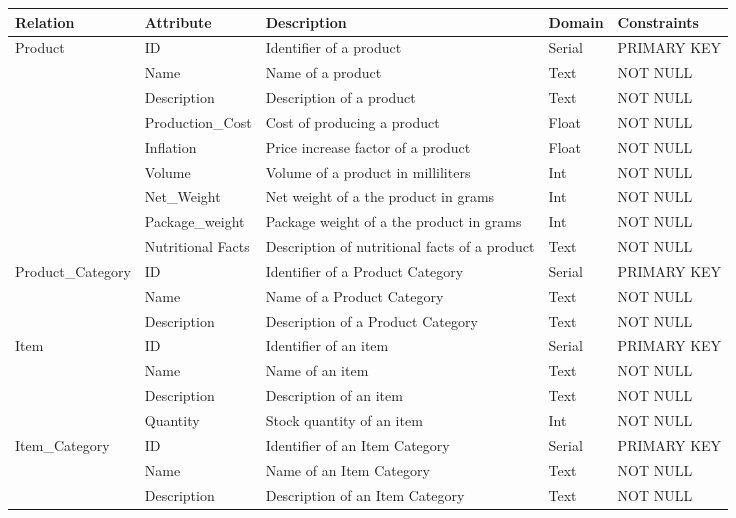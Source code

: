 \begin{longtable}{|p{}|p{} |p{}|p{}|p{} |} 
\hline
\textbf{Relation} & \textbf{Attribute} & \textbf{Description} & \textbf{Domain} & \textbf{Constraints} \\\hline

\multirow{9}{*}{Product} & ID & Identifier of a product & Serial &  PRIMARY KEY\\\cline{2-5}
& Name & Name of a product & Text & NOT NULL \\\cline{2-5}
& Description & Description of a product  & Text & NOT NULL \\\cline{2-5} 
& Production\_Cost & Cost  of  producing a product & Float & NOT NULL \\\cline{2-5} 
& Inflation & Price increase factor of a product & Float & NOT NULL \\\cline{2-5} 
& Volume & Volume of a product in milliliters  & Int & NOT NULL \\\cline{2-5} 
& Net\_Weight & Net weight of a the product in grams & Int & NOT NULL \\\cline{2-5} 
& Package\_weight & Package weight of a the product in grams & Int  & NOT NULL \\\cline{2-5} 
& Nutritional Facts & Description of nutritional facts of a product & Text & NOT NULL \\\hline

\multirow{3}{*}{Product\_Category} & ID & Identifier of a Product Category & Serial & PRIMARY KEY \\\cline{2-5}
& Name & Name of a Product Category & Text & NOT NULL \\\cline{2-5}
& Description & Description of a Product Category & Text & NOT NULL \\\hline

\multirow{4}{*}{Item} & ID & Identifier of an item  & Serial & PRIMARY KEY \\\cline{2-5}
& Name & Name of an item & Text & NOT NULL\\\cline{2-5}
& Description & Description of an item & Text & NOT NULL \\\cline{2-5}
& Quantity & Stock quantity of an item & Int & NOT NULL \\\hline

\multirow{3}{*}{Item\_Category} & ID & Identifier of an Item Category & Serial & PRIMARY KEY \\\cline{2-5}
& Name & Name of an Item Category & Text & NOT NULL\\\cline{2-5}
& Description & Description of an Item Category & Text & NOT NULL \\\hline


\end{longtable}
